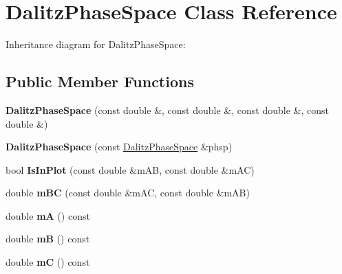 \hypertarget{class_dalitz_phase_space}{}\section{Dalitz\+Phase\+Space Class Reference}
\label{class_dalitz_phase_space}


Inheritance diagram for Dalitz\+Phase\+Space\+:
\subsection*{Public Member Functions}
\begin{DoxyCompactItemize}
\item 
\hypertarget{class_dalitz_phase_space_a832792efa952f092936ca31d70da0f84}{}{\bfseries Dalitz\+Phase\+Space} (const double \&, const double \&, const double \&, const double \&)\label{class_dalitz_phase_space_a832792efa952f092936ca31d70da0f84}

\item 
\hypertarget{class_dalitz_phase_space_a8e3e7d9f2a5e11f7d23847a8344991a9}{}{\bfseries Dalitz\+Phase\+Space} (const \hyperlink{class_dalitz_phase_space}{Dalitz\+Phase\+Space} \&phsp)\label{class_dalitz_phase_space_a8e3e7d9f2a5e11f7d23847a8344991a9}

\item 
\hypertarget{class_dalitz_phase_space_a32b766c1b45dc8e9ee6b43b278377938}{}bool {\bfseries Is\+In\+Plot} (const double \&m\+A\+B, const double \&m\+A\+C)\label{class_dalitz_phase_space_a32b766c1b45dc8e9ee6b43b278377938}

\item 
\hypertarget{class_dalitz_phase_space_a54ede717a70d6a0fd30aa6ee096d10ca}{}double {\bfseries m\+B\+C} (const double \&m\+A\+C, const double \&m\+A\+B)\label{class_dalitz_phase_space_a54ede717a70d6a0fd30aa6ee096d10ca}

\item 
\hypertarget{class_dalitz_phase_space_a8e44e9afdef65774dc9688c23476043c}{}double {\bfseries m\+A} () const \label{class_dalitz_phase_space_a8e44e9afdef65774dc9688c23476043c}

\item 
\hypertarget{class_dalitz_phase_space_a880c7e728ece392e460fd02eff4f96b9}{}double {\bfseries m\+B} () const \label{class_dalitz_phase_space_a880c7e728ece392e460fd02eff4f96b9}

\item 
\hypertarget{class_dalitz_phase_space_a908af00651631dd92572f3ad71155264}{}double {\bfseries m\+C} () const \label{class_dalitz_phase_space_a908af00651631dd92572f3ad71155264}


\end{DoxyCompactItemize}
